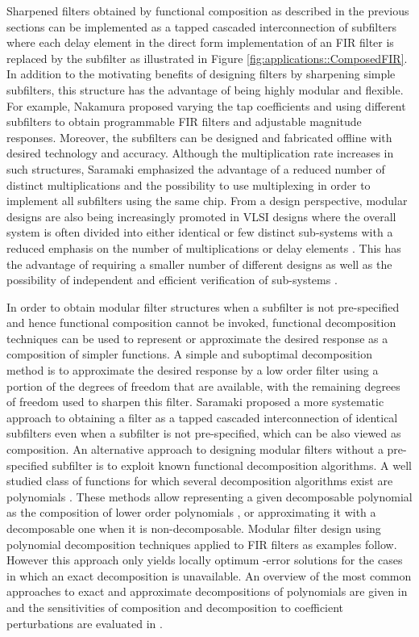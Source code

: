 \documentclass[journal] {IEEEtran}
\begin{document}
Sharpened filters obtained by functional composition as described in the previous sections can be implemented as a tapped cascaded interconnection of subfilters where each delay element in the direct form implementation of an FIR filter  is replaced by the subfilter  as illustrated in Figure \ref{fig:applications::ComposedFIR}. In addition to the motivating benefits of designing filters by sharpening simple subfilters, this structure has the advantage of being highly modular and flexible. For example, Nakamura \cite{Nakamura1985} proposed varying the tap coefficients and using different subfilters to obtain programmable FIR filters and adjustable magnitude responses. Moreover, the subfilters can be designed and fabricated offline with desired technology and accuracy. Although the multiplication rate increases in such structures, Saramaki \cite{Saramaki} emphasized the advantage of a reduced number of distinct multiplications and the possibility to use multiplexing in order to implement all subfilters using the same chip. From a design perspective, modular designs are also being increasingly promoted in VLSI designs where the overall system is often divided into either identical or few distinct sub-systems with a reduced emphasis on the number of multiplications or delay elements \cite{Mertzios1989}. This has the advantage of requiring a smaller number of different designs as well as the possibility of independent and efficient verification of sub-systems \cite{Mertzios1989, Vai2001}. 

In order to obtain modular filter structures when a subfilter is not pre-specified and hence functional composition cannot be invoked, functional decomposition techniques can be used to represent or approximate the desired response as a composition of simpler functions. A simple and suboptimal decomposition method is to approximate the desired response by a low order filter using a portion of the degrees of freedom that are available, with the remaining degrees of freedom used to sharpen this filter. Saramaki \cite{Saramaki} proposed a more systematic approach to obtaining a filter as a tapped cascaded interconnection of identical subfilters even when a subfilter is not pre-specified, which can be also viewed as composition. An alternative approach to designing modular filters without a pre-specified subfilter is to exploit known functional decomposition algorithms. A well studied class of functions for which several decomposition algorithms exist are polynomials \cite{Barton, Alagar,Kozen1989,Aubry2012, Corless, Giesbrecht, Botting2005}. These methods allow representing a given decomposable polynomial  as the composition of lower order polynomials , or approximating it with a decomposable one when it is non-decomposable. Modular filter design using polynomial decomposition techniques applied to FIR filters as examples follow. However this approach only yields locally optimum -error solutions for the cases in which an exact decomposition is unavailable. An overview of the most common approaches to exact and approximate decompositions of polynomials are given in \cite{Demirtas2013} and the sensitivities of composition and decomposition to coefficient perturbations are evaluated in \cite{Demirtas2012}.
\end{document}
